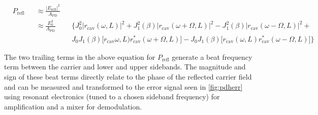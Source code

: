 
%



\begin{equation}
 \begin{alignedat}{3}
    &P_\mathrm{refl} && \approx \frac{|E_\mathrm{refl}|^2}{A_\mathrm{PD}} && \\
    & &&\approx \frac{E_0^2}{A_\mathrm{PD}} && \bigg\{J_0^2 |r_\mathrm{cav}(\omega,L)|^2 + J_1^2(\beta)|r_\mathrm{cav}(\omega+\Omega,L)|^2 - J_1^2(\beta)|r_\mathrm{cav}(\omega-\Omega,L)|^2 +  \\
    & && && J_0J_1(\beta)\big[r_\mathrm{cav}\omega,L) r_\mathrm{cav}^*(\omega+\Omega,L)\big] - J_ 0J_1(\beta)\big[r_\mathrm{cav}(\omega,L)r_\mathrm{cav}^*(\omega-\Omega,L)\big]\bigg\}
  \end{alignedat}
\end{equation}

The two trailing terms in the above equation for $P_\mathrm{refl}$ generate a beat frequency term between the carrier and lower and upper sidebands. The magnitude and sign of these beat terms directly relate to the phase of the reflected carrier field and can be measured and transformed to the error signal seen in \autoref{fig:pdherr} using resonant electronics (tuned to a chosen sideband frequency) for amplification and a mixer for demodulation.

